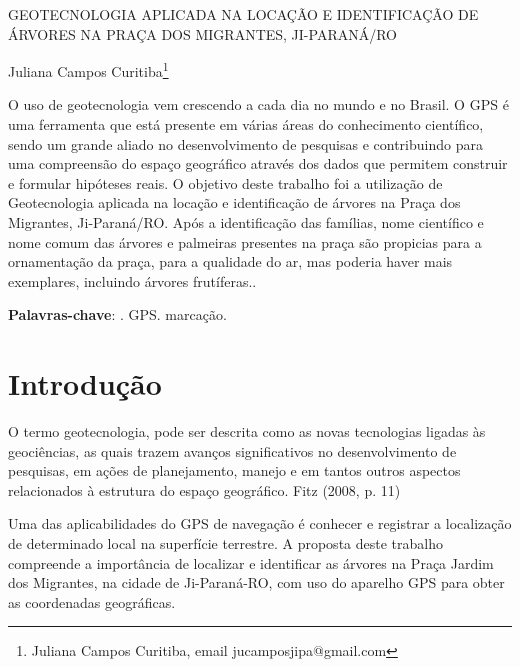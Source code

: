 \documentclass[article,12pt,onesidea,4paper,english,brazil]{abntex2}
\begin{document}
	
	
	\frenchspacing 
	
	\begin{center}
		\LARGE GEOTECNOLOGIA APLICADA NA LOCAÇÃO E IDENTIFICAÇÃO DE ÁRVORES NA PRAÇA DOS MIGRANTES, JI-PARANÁ/RO
		
		\normalsize
		Juliana Campos Curitiba\footnote{Juliana Campos Curitiba, email jucamposjipa@gmail.com} 
		
	\end{center}
	
	\begin{resumoumacoluna}
		 O uso de geotecnologia vem crescendo a cada dia no mundo e no Brasil. O GPS é uma ferramenta que está presente em várias áreas do conhecimento científico, sendo um grande aliado no desenvolvimento de pesquisas e contribuindo para uma compreensão do espaço geográfico através dos dados que permitem construir e formular hipóteses reais. O objetivo deste trabalho foi a utilização de Geotecnologia aplicada na locação e identificação de árvores na Praça dos Migrantes, Ji-Paraná/RO. Após a identificação das famílias, nome científico e nome comum das árvores e palmeiras presentes na praça são propicias para a ornamentação da praça, para a qualidade do ar, mas poderia haver mais exemplares, incluindo árvores frutíferas..
		
		\vspace{\onelineskip}
		
		\noindent
		\textbf{Palavras-chave}: . GPS. marcação.
		
		
	\end{resumoumacoluna}
	
	\section*{Introdução}
	
	O termo geotecnologia, pode ser descrita como as novas tecnologias ligadas às geociências, as quais trazem avanços significativos no desenvolvimento de pesquisas, em ações de planejamento, manejo e em tantos outros aspectos relacionados à estrutura do espaço geográfico. Fitz (2008, p. 11)
	
	Uma das aplicabilidades do GPS de navegação é conhecer e registrar a localização de determinado local na superfície terrestre. A proposta deste trabalho compreende a importância de localizar e identificar as árvores na Praça Jardim dos Migrantes, na cidade de Ji-Paraná-RO, com uso do aparelho GPS para obter as coordenadas geográficas.
	
\end{document}
